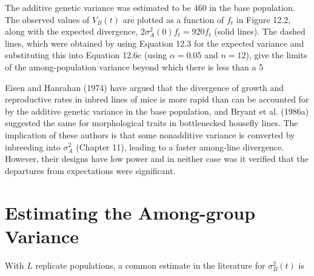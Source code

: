 \documentclass{article}
\begin{document}
The additive genetic variance was estimated to be 460 in the base population. The observed values of  $ V_B(t) $ are plotted as a function of  $ f_t $ in Figure 12.2, along with the expected divergence,  $ 2\sigma_A^2(0)f_t = 920f_t $ (solid lines). The dashed lines, which were obtained by using Equation 12.3 for the expected variance and substituting this into Equation 12.6c (using  $ \alpha = 0.05 $ and  $ n = 12 $), give the limits of the among-population variance beyond which there is less than a 5%

Eisen and Hanrahan (1974) have argued that the divergence of growth and reproductive rates in inbred lines of mice is more rapid than can be accounted for by the additive genetic variance in the base population, and Bryant et al. (1986a) suggested the same for morphological traits in bottlenecked housefly lines. The implication of these authors is that some nonadditive variance is converted by inbreeding into  $ \sigma_{A}^{2} $ (Chapter 11), leading to a faster among-line divergence. However, their designs have low power and in neither case was it verified that the departures from expectations were significant.

\section{Estimating the Among-group Variance}
With  $ L $ replicate populations, a common estimate in the literature for  $ \sigma_B^2(t) $ is
\end{document}
